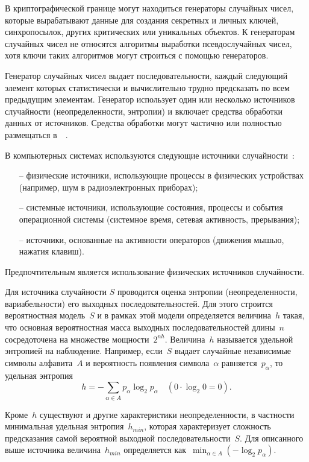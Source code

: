 В криптографической границе \TOE могут находиться генераторы случайных
чисел, которые вырабатывают данные для создания 
секретных и личных ключей, синхропосылок, других критических или 
уникальных объектов.
К генераторам случайных чисел не относятся 
алгоритмы выработки псевдослучайных чисел,
хотя ключи таких алгоритмов могут строиться с помощью генераторов.

Генератор случайных чисел выдает последовательности,
каждый следующий элемент которых 
статистически и вычислительно трудно предсказать 
по всем предыдущим элементам.
%
Генератор использует один или несколько 
источников случайности (неопределенности, энтропии)
и включает средства обработки данных от источников. 
%
Средства обработки могут частично или полностью 
размещаться в~\TOE~.

В компьютерных системах 
используются следующие источники случайности~:
\begin{itemize}
\item[--]
физические источники, использующие процессы в физических устройствах
(например, шум в радиоэлектронных приборах);

\item[--]
системные источники, использующие состояния, 
процессы и события операционной системы
(системное время, сетевая активность, прерывания);

\item[--]
источники, основанные на активности операторов
(движения мышью, нажатия клавиш).
\end{itemize}

Предпочтительным является использование физических источников случайности.

Для источника случайности $S$ проводится оценка энтропии 
(неопределенности, вариабельности) его выходных последовательностей.
Для этого строится вероятностная модель~$S$ 
и в рамках этой модели определяется величина~$h$ такая, 
что основная вероятностная масса выходных последовательностей 
длины~$n$ сосредоточена на множестве мощности~$2^{nh}$.
Величина~$h$ называется удельной энтропией на наблюдение.
%
Например, если~$S$ выдает случайные независимые символы 
алфавита~$A$ и вероятность появления символа~$\alpha$ 
равняется~$p_\alpha$, то удельная энтропия
$$
h=-\sum_{\alpha\in A}p_\alpha\log_2 p_\alpha\quad
(0\cdot\log_2 0=0).
$$

Кроме~$h$ существуют и другие характеристики неопределенности,
в частности минимальная удельная энтропия~$h_{min}$,
которая характеризует сложность предсказания самой 
вероятной выходной последовательности~$S$.
Для описанного выше источника величина~$h_{min}$
определяется как~$\min_{\alpha\in A}(-\log_2 p_\alpha)$.

